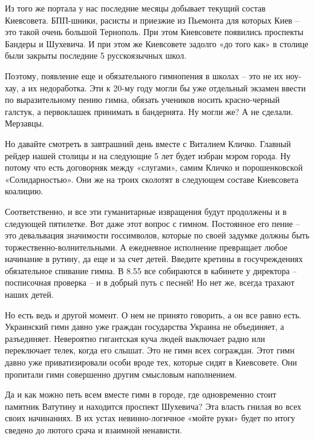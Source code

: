Из того же портала у нас последние месяцы добывает текущий состав Киевсовета.
БПП-шники, расисты и приезжие из Пьемонта для которых Киев – это такой очень
большой Тернополь. При этом Киевсовете появились проспекты Бандеры и Шухевича.
И при этом же Киевсовете задолго «до того как» в столице были закрыты последние
5 русскоязычных школ.

Поэтому, появление еще и обязательного гимнопения в школах – это не их ноу-хау,
а их недоработка. Эти к 20-му году могли бы уже отдельный экзамен ввести по
выразительному пению гимна, обязать учеников носить красно-черный галстук, а
первоклашек принимать в бандернята. Ну могли же? А не сделали. Мерзавцы.

Но давайте смотреть в завтрашний день вместе с Виталием Кличко. Главный рейдер
нашей столицы и на следующие 5 лет будет избран мэром города. Ну потому что
есть договорняк между «слугами», самим Кличко и порошенковской «Солидарностью».
Они же на троих сколотят в следующем составе Киевсовета коалицию.

Соответственно, и все эти гуманитарные извращения будут продолжены и в
следующей пятилетке. Вот даже этот вопрос с гимном. Постоянное его пение – это
девальвация значимости госсимволов, которые по своей задумке должны быть
торжественно-волнительными. А ежедневное исполнение превращает любое начинание
в рутину, да еще и за счет детей. Введите кретины в госучреждениях обязательное
спивание гимна. В 8.55 все собираются в кабинете у директора – посписочная
проверка – и в добрый путь с песней! Но нет же, всегда трахают наших детей.

Но есть ведь и другой момент. О нем не принято говорить, а он все равно есть.
Украинский гимн давно уже граждан государства Украина не объединяет, а
разъединяет. Невероятно гигантская куча людей выключает радио или переключает
телек, когда его слышат. Это не гимн всех сограждан. Этот гимн давно уже
приватизировали особи вроде тех, которые сидят в Киевсовете. Они пропитали гимн
совершенно другим смысловым наполнением.

Да и как можно петь всем вместе гимн в городе, где одновременно стоит памятник
Ватутину и находится проспект Шухевича? Эта власть гнилая во всех своих
начинаниях. В их устах невинно-логичное «мойте руки» будет по итогу сведено до
лютого срача и взаимной ненависти.

